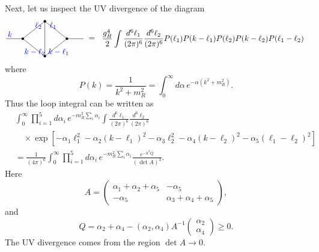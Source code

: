 Next, let us inspect the UV divergence of the diagram
\[
\begin{tikzpicture}[baseline=(eq.base),scale=.82]
  \coordinate (eq) at (0,0);
  \coordinate (L) at (-1.2,0);
  \coordinate (R) at (1.2,0);
  \coordinate (T) at (0,.95);
  \coordinate (B) at (0,-.95);
  \draw (-2.1,0)--(L);
  \draw (R)--(2.1,0);
  \draw (L)--(T)--(R)--(B)--cycle;
  \draw (T)--(B);
  \fill (L) circle (2pt);
  \fill (R) circle (2pt);
  \fill (T) circle (2pt);
  \fill (B) circle (2pt);
  \node[blue] at (-1.9,.25) {\(k\)};
  \node[blue] at (-.35,.72) {\(\ell_2\)};
  \node[blue] at (.45,.72) {\(\ell_1\)};
  \node[blue] at (-.55,-.72) {\(k-\ell_2\)};
  \node[blue] at (.75,-.72) {\(k-\ell_1\)};
  \node at (2.55,0) {\(=\)};
  \node[anchor=west] at (2.95,0) {\(\displaystyle
    \frac{g_R^4}{2}
    \int\frac{d^6\ell_1}{(2\pi)^6}
        \frac{d^6\ell_2}{(2\pi)^6}
    P(\ell_1)P(k-\ell_1)P(\ell_2)P(k-\ell_2)P(\ell_1-\ell_2)
  \)};
\end{tikzpicture}
\]
where
\[
  P(k)=\frac{1}{k^2+m_R^2}
      =\int_0^\infty d\alpha\,e^{-\alpha(k^2+m_R^2)} .
\]
Thus the loop integral can be written as
\[
\begin{split}
  &\int_0^\infty\prod_{i=1}^5 d\alpha_i\,
    e^{-m_R^2\sum_i\alpha_i}
  \int\frac{d^6\ell_1}{(2\pi)^6}
      \frac{d^6\ell_2}{(2\pi)^6}  \\
  &\quad\times
  \exp\!\left[
    -\alpha_1\ell_1^2
    -\alpha_2(k-\ell_1)^2
    -\alpha_3\ell_2^2
    -\alpha_4(k-\ell_2)^2
    -\alpha_5(\ell_1-\ell_2)^2
  \right]  \\
  &=
  \frac{1}{(4\pi)^6}
  \int_0^\infty\prod_{i=1}^5 d\alpha_i\,
  e^{-m_R^2\sum_i\alpha_i}
  \frac{e^{-k^2Q}}{(\det A)^3}.
\end{split}
\]
Here
\[
  A=
  \begin{pmatrix}
    \alpha_1+\alpha_2+\alpha_5 & -\alpha_5\\
    -\alpha_5 & \alpha_3+\alpha_4+\alpha_5
  \end{pmatrix},
\]
and
\[
  Q=\alpha_2+\alpha_4
  -(\alpha_2,\alpha_4)A^{-1}
  \begin{pmatrix}\alpha_2\\ \alpha_4\end{pmatrix}
  \ge 0 .
\]
The UV divergence comes from the region \(\det A\to0\).

